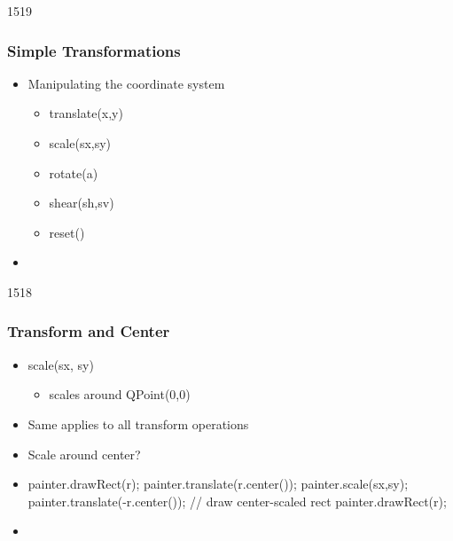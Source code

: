 \begin{slide}{1519}\frametitle{Simple Transformations}
  \begin{itemize}
  \item Manipulating the coordinate system
    \begin{itemize}
    \item translate(x,y)
    \item scale(sx,sy)
    \item rotate(a)
    \item shear(sh,sv)
    \item reset()
    \end{itemize}
 \item[] 
  \end{itemize}
\end{slide}

\begin{slide}[fragile]{1518}\frametitle{Transform and Center}
  \begin{itemize}
  \item scale(sx, sy)
    \begin{itemize}
    \item scales around QPoint(0,0)
    \end{itemize}
  \item Same applies to all transform operations
  \item Scale around center?
  \item [] \begin{cpp}
painter.drawRect(r);
painter.translate(r.center());
painter.scale(sx,sy);
painter.translate(-r.center());
// draw center-scaled rect      
painter.drawRect(r); 
    \end{cpp}
 \item[] 
  \end{itemize}
\end{slide}


